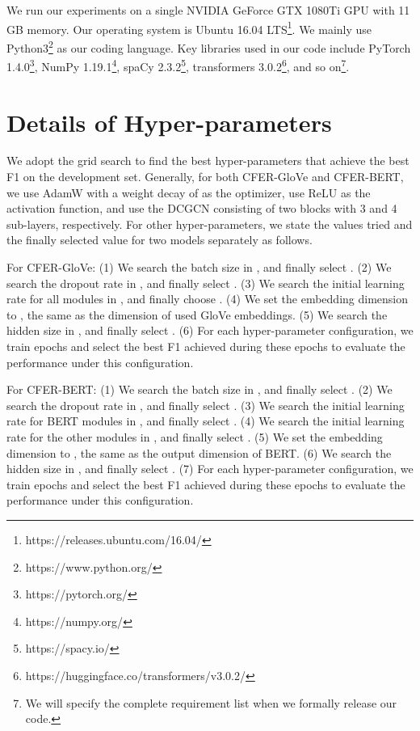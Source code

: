 \documentclass[letterpaper]{article} \usepackage{aaai21}  \usepackage{times}  \usepackage{helvet} \usepackage{courier}  \usepackage[hyphens]{url}  \usepackage{graphicx} \urlstyle{rm} \def\UrlFont{\rm}  \usepackage{natbib}  \usepackage{caption} \frenchspacing  \setlength{\pdfpagewidth}{8.5in}  \setlength{\pdfpageheight}{11in}
\begin{document}
We run our experiments on a single NVIDIA GeForce GTX 1080Ti GPU with 11 GB memory. 
Our operating system is Ubuntu 16.04 LTS\footnote{https://releases.ubuntu.com/16.04/}. 
We mainly use Python3\footnote{https://www.python.org/} as our coding language. 
Key libraries used in our code include PyTorch 1.4.0\footnote{https://pytorch.org/}, NumPy 1.19.1\footnote{https://numpy.org/}, spaCy 2.3.2\footnote{https://spacy.io/}, transformers 3.0.2\footnote{https://huggingface.co/transformers/v3.0.2/}, and so on\footnote{We will specify the complete requirement list when we formally release our code. }. 

\section{Details of Hyper-parameters}

We adopt the grid search to find the best hyper-parameters that achieve the best F1 on the development set. 
Generally, for both CFER-GloVe and CFER-BERT, we use AdamW with a weight decay of  as the optimizer, use ReLU as the activation function, and use the DCGCN consisting of two blocks with 3 and 4 sub-layers, respectively. 
For other hyper-parameters, we state the values tried and the finally selected value for two models separately as follows. 

For CFER-GloVe: 
(1) We search the batch size in , and finally select . 
(2) We search the dropout rate in , and finally select . 
(3) We search the initial learning rate for all modules in , and finally choose . 
(4) We set the embedding dimension to , the same as the dimension of used GloVe embeddings. 
(5) We search the hidden size in , and finally select . 
(6) For each hyper-parameter configuration, we train  epochs and select the best F1 achieved during these  epochs to evaluate the performance under this configuration. 

For CFER-BERT: 
(1) We search the batch size in , and finally select . 
(2) We search the dropout rate in , and finally select . 
(3) We search the initial learning rate for BERT modules in , and finally select . 
(4) We search the initial learning rate for the other modules in , and finally select . 
(5) We set the embedding dimension to , the same as the output dimension of BERT. 
(6) We search the hidden size in , and finally select . 
(7) For each hyper-parameter configuration, we train  epochs and select the best F1 achieved during these  epochs to evaluate the performance under this configuration. 
\end{document}
